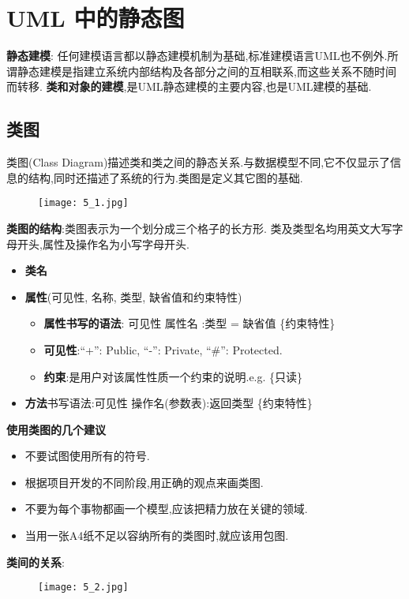 \documentclass[../main.tex]{subfiles}
\begin{document}
\section{UML 中的静态图}
\textbf{静态建模}:
任何建模语言都以静态建模机制为基础,标准建模语言UML也不例外.所谓静态建模是指建立系统内部结构及各部分之间的互相联系,而这些关系不随时间而转移.
\textbf{类和对象的建模},是UML静态建模的主要内容,也是UML建模的基础.
\subsection{类图}
类图(Class Diagram)描述类和类之间的静态关系.与数据模型不同,它不仅显示了信息的结构,同时还描述了系统的行为.类图是定义其它图的基础.
\begin{figure}[H]
  \begin{center}
    \texttt{[image: 5\_1.jpg]}
  \end{center}
\end{figure}
\textbf{类图的结构}:类图表示为一个划分成三个格子的长方形.
类及类型名均用英文大写字母开头,属性及操作名为小写字母开头.
\begin{itemize}
  \item \textbf{类名}
  \item \textbf{属性}(可见性, 名称, 类型, 缺省值和约束特性)
    \begin{itemize}
      \item \textbf{属性书写的语法}: 可见性 属性名 :类型 = 缺省值 \{约束特性\}
      \item \textbf{可见性}:``+'': Public, ``-'': Private, ``\#'': Protected.
      \item \textbf{约束}:是用户对该属性性质一个约束的说明.e.g. \{只读\}
    \end{itemize}
  \item \textbf{方法}书写语法:可见性 操作名(参数表):返回类型 \{约束特性\}
\end{itemize}
\textbf{使用类图的几个建议}
\begin{itemize}
  \item 不要试图使用所有的符号.
  \item 根据项目开发的不同阶段,用正确的观点来画类图.
  \item 不要为每个事物都画一个模型,应该把精力放在关键的领域.
  \item 当用一张A4纸不足以容纳所有的类图时,就应该用包图.
\end{itemize}
\textbf{类间的关系}:
\begin{figure}[H]
  \begin{center}
    \texttt{[image: 5\_2.jpg]}
  \end{center}
\end{figure}
\end{document}
